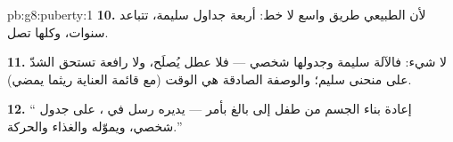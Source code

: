 \begin{solution}{pb:g8:puberty:1}
\textbf{10.} لأن الطبيعي طريق واسع لا خط: أربعة جداول سليمة،
تتباعد سنوات، وكلها تصل.

\textbf{11.} لا شيء: فالآلة سليمة وجدولها شخصي --- فلا عطل يُصلَح،
ولا رافعة تستحق الشدّ على منحنى سليم؛ والوصفة الصادقة هي الوقت (مع
قائمة العناية ريثما يمضي).

\textbf{12.} `` إعادة بناء الجسم من طفل إلى بالغ بأمر
 --- يديره رسل في ، على جدول شخصي، ويموّله 
والغذاء والحركة.''
\end{solution}
